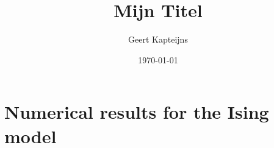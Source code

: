 \documentclass[9pt, ebook, openany, oneside]{memoir}
\renewcommand{\afterchaptertitle}{%
 \vskip2em
 \hrule height 0.6pt
 \vskip2em
 }
\begin{document}
\pagestyle{simple}



\frontmatter

\title{Mijn Titel}
\author{Geert Kapteijns}
\date{\today}


\begingroup
\renewcommand{\afterchaptertitle}{\vskip1.5em}

\tableofcontents*
\endgroup

\mainmatter

% 
%
% 
%
% 
%
% 
%
% 
%
% 
\chapter{Numerical results for the Ising model}


% 
\end{document}
